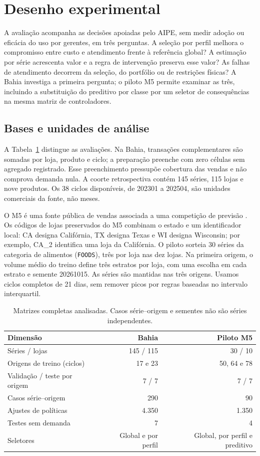 \documentclass[preprint,12pt]{elsarticle}
\begin{document}
\section{Desenho experimental}
A avaliação acompanha as decisões apoiadas pelo AIPE, sem medir adoção ou eficácia do uso por gerentes, em três perguntas. A seleção por perfil melhora o compromisso entre custo e atendimento frente à referência global? A estimação por série acrescenta valor e a regra de intervenção preserva esse valor? As falhas de atendimento decorrem da seleção, do portfólio ou de restrições físicas? A Bahia investiga a primeira pergunta; o piloto M5 permite examinar as três, incluindo a substituição do preditivo por classe por um seletor de consequências na mesma matriz de controladores.
\subsection{Bases e unidades de análise}
A Tabela~\ref{tab:datasets} distingue as avaliações. Na Bahia, transações complementares são somadas por loja, produto e ciclo; a preparação preenche com zero células sem agregado registrado. Esse preenchimento pressupõe cobertura das vendas e não comprova demanda nula. A coorte retrospectiva contém 145 séries, 115 lojas e nove produtos. Os 38 ciclos disponíveis, de 202301 a 202504, são unidades comerciais da fonte, não meses.

O M5 é uma fonte pública de vendas associada a uma competição de previsão \cite{Makridakis2022M5Accuracy}. Os códigos de lojas preservados do M5 combinam o estado e um identificador local: CA designa Califórnia, TX designa Texas e WI designa Wisconsin; por exemplo, CA\_2 identifica uma loja da Califórnia. O piloto sorteia 30 séries da categoria de alimentos (\texttt{FOODS}), três por loja nas dez lojas. Na primeira origem, o volume médio do treino define três estratos por loja, com uma escolha em cada estrato e semente 20261015. As séries são mantidas nas três origens. Usamos ciclos completos de 21 dias, sem remover picos por regras baseadas no intervalo interquartil.

\begin{table}[htbp]\centering\small
\caption{Matrizes completas analisadas. Casos série--origem e sementes não são séries independentes.}\label{tab:datasets}
\begin{tabular}{@{}lrr@{}}\toprule
Dimensão & Bahia & Piloto M5\\\midrule
Séries / lojas & 145 / 115 & 30 / 10\\
Origens de treino (ciclos) & 17 e 23 & 50, 64 e 78\\
Validação / teste por origem & 7 / 7 & 7 / 7\\
Casos série--origem & 290 & 90\\
Ajustes de políticas & 4.350 & 1.350\\
Testes sem demanda & 7 & 4\\
Seletores & Global e por perfil & Global, por perfil e preditivo\\\bottomrule
\end{tabular}\end{table}
\end{document}
